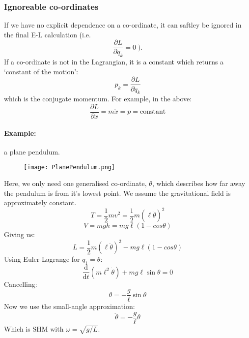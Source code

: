 \subsubsection{Ignoreable co-ordinates}
If we have no explicit dependence on a co-ordinate, it can saftley be ignored
in the final E-L calculation (i.e.
$$
	\frac{\partial L}{\partial q_k} = 0\; ).
$$
If a co-ordinate is not in the Lagrangian, it is a constant which returns a 
`constant of the motion':
$$
	p_k = \frac{\partial L}{\partial \dot{q}_k}
$$
which is the conjugate momentum. For example, in the above:
$$
	\frac{\partial L}{\partial \dot{x}} = m\dot{x} = p = \mathrm{constant}
$$

\clearpage

\paragraph{Example:} a plane pendulum.
\begin{figure}[!hbt]
	\centering
	\texttt{[image: PlanePendulum.png]}
\end{figure}

Here, we only need one generalised co-ordinate, $\theta$, which describes how
far away the pendulum is from it's lowest point. We assume the gravitational
field is approximately constant.
$$
	T = \frac{1}{2}mv^2 = \frac{1}{2}m\left(\ell \dot{\theta}\right)^2
$$
$$
	V = mgh = mg\ell(1 - cos\theta)
$$
Giving us:
$$
	L = \frac{1}{2}m\left(\ell \dot{\theta}\right)^2 - 
	mg\ell(1 - cos\theta)
$$
Using Euler-Lagrange for $q_1 = \theta$:
$$
	\frac{\mathrm{d}}{\mathrm{d}t} \left(m \ell^2 \dot{\theta}\right) +
	mg\ell \sin \theta = 0
$$
Cancelling:
$$
	\ddot{\theta} = -\frac{g}{\ell}\sin\theta
$$
Now we use the small-angle approximation:
$$
	\ddot{\theta} = -\frac{g}{\ell}\theta
$$
Which is SHM with $\omega = \sqrt{g/L}$.

